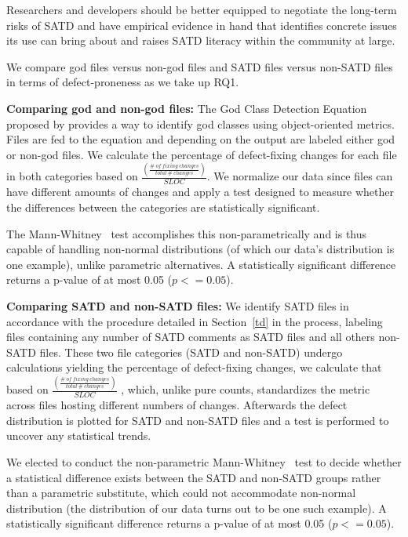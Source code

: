 Researchers and developers should be better equipped to negotiate the long-term risks of SATD and have empirical evidence in hand that identifies concrete issues its use can bring about and raises SATD literacy within the community at large.


We compare god files versus non-god files and SATD files versus non-SATD files in terms of defect-proneness as we take up RQ1.


\noindent\textbf{Comparing god and non-god files:}
The God Class Detection Equation proposed by \cite{marinescu2004detection} provides a way to identify god classes using object-oriented metrics. Files are fed to the equation and depending on the output are labeled either god or non-god files. We calculate the percentage of defect-fixing changes for each file in both categories based on $\frac{\left (\frac{\#~of~fixing~changes}{total~\#~changes} \right )}{SLOC}$. We normalize our data since files can have different amounts of changes and apply a test designed to measure whether the differences between the categories are statistically significant.

The Mann-Whitney~\cite{mann1947test} test accomplishes this non-parametrically and is thus capable of handling non-normal distributions (of which our data's distribution is one example), unlike parametric alternatives. A statistically significant difference returns a p-value of at most 0.05 ($p <= 0.05$).


\noindent\textbf{Comparing SATD and non-SATD files:}
We identify SATD files in accordance with the procedure detailed in Section~\ref{td} in the process, labeling files containing any number of SATD comments as SATD files and all others non-SATD files. These two file categories (SATD and non-SATD) undergo calculations yielding the percentage of defect-fixing changes, we calculate that based on $\frac{\left (\frac{\#~of~fixing~changes}{total~\#~changes} \right )}{SLOC}$ , which, unlike pure counts, standardizes the metric across files hosting different numbers of changes. Afterwards the defect distribution is plotted for SATD and non-SATD files and a test is performed to uncover any statistical trends.

We elected to conduct the non-parametric Mann-Whitney~\cite{mann1947test} test to decide whether a statistical difference exists between the SATD and non-SATD groups rather than a parametric substitute, which could not accommodate non-normal distribution (the distribution of our data turns out to be one such example). A statistically significant difference returns a p-value of at most 0.05 ($p <= 0.05$). 


